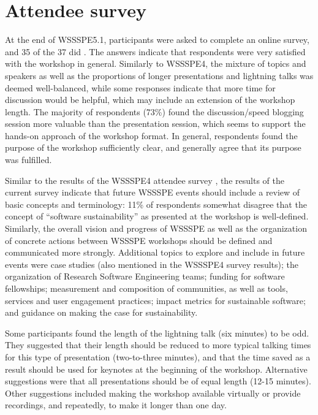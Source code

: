 \documentclass[11pt,letterpaper]{article}
\begin{document}
\section{Attendee survey} \label{sec:survey}

At the end of WSSSPE5.1, participants were asked to complete an online survey, and 35 of the 37 did \cite{druskat_survey}.
%
The answers indicate that respondents were very satisfied with the workshop in general. Similarly to WSSSPE4\cite{WSSSPE4-report}, the mixture of topics and speakers as well as the proportions of longer presentations and lightning talks was deemed well-balanced, while some responses indicate that more time for discussion would be helpful, which may include an extension of the workshop length. The majority of respondents (73\%) found the discussion/speed blogging session more valuable than the presentation session, which seems to support the hands-on approach of the workshop format. In general, respondents found the purpose of the workshop sufficiently clear, and generally agree that its purpose was fulfilled.

Similar to the results of the WSSSPE4 attendee survey \cite{WSSSPE4-report}, the results of the current survey indicate that future WSSSPE events should include a review of basic concepts and terminology: 11\% of respondents somewhat disagree that the concept of ``software sustainability'' as presented at the workshop is well-defined. Similarly, the overall vision and progress of WSSSPE as well as the organization of concrete actions between WSSSPE workshops should be defined and communicated more strongly. Additional topics to explore and include in future events were case studies (also mentioned in the WSSSPE4 survey results); the organization of Research Software Engineering teams; funding for software fellowships; measurement and composition of communities, as well as tools, services and user engagement practices; impact metrics for sustainable software; and guidance on making the case for sustainability.

Some participants found the length of the lightning talk (six minutes) to be odd. They suggested that their length should be reduced to more typical talking times for this type of presentation (two-to-three minutes), and that the time saved as a result should be used for keynotes at the beginning of the workshop. Alternative suggestions were that all presentations should be of equal length (12-15 minutes). Other suggestions included making the workshop available virtually or provide recordings, and repeatedly, to make it longer than one day.
\end{document}
